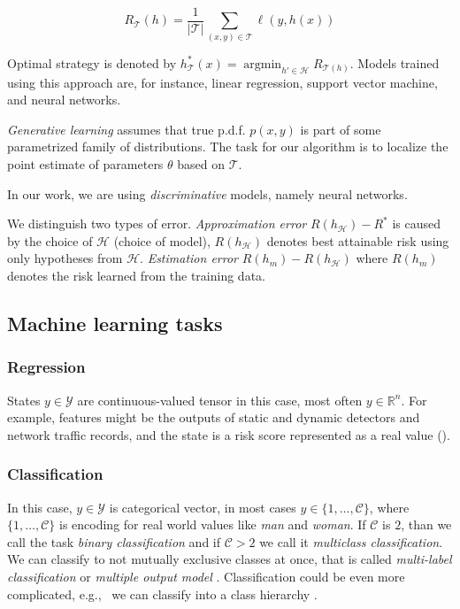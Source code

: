 \begin{equation} \label{eq:emploss}
    R_{\mathcal{T}}(h)= \frac{1}{|\mathcal{T}|} \sum_{(x,y) \in \mathcal
    T}\ell(y,h(x))
\end{equation}

Optimal strategy is denoted by $h_{\mathcal{T}}^*(x)=\operatorname*{argmin}_{{h}'\in \mathcal{H}}R_{\mathcal{T}(h)}$. Models trained using this approach are, for instance, linear regression, support vector machine, and neural networks.

\emph{Generative learning} assumes that true p.d.f. $p(x,y)$ is part of some parametrized family of distributions. The task for our algorithm is to localize the point estimate of parameters $\theta$ based on $\mathcal{T}$.

In our work, we are using \emph{discriminative} models, namely neural networks.


We distinguish two types of error. \emph{Approximation error} $R(h_{\mathcal{H}})-R^*$  is caused by the choice of $\mathcal{H}$ (choice of model), $R(h_{\mathcal{H}})$ denotes best attainable risk using only hypotheses from $\mathcal{H}$. \emph{Estimation error} $R(h_{m})-R(h_{\mathcal{H}})$ where $R(h_{m})$ denotes the risk learned from the training data.


\subsection{Machine learning tasks}
\subsubsection*{Regression}
States $y \in \mathcal{Y}$ are continuous-valued tensor in this case, most often $y \in \mathbb{R}^{n}$. For example, features might be the outputs of static and dynamic detectors and network traffic records, and the state is a risk score represented as a real value (\cite{Jaganathan2015}).

\subsubsection*{Classification}
In this case, $y \in \mathcal{Y}$ is categorical vector, in most cases $y \in \{1,\dots,\mathcal{C}\}$, where $\{1,\dots,\mathcal{C}\}$ is encoding for real world values like \emph{man} and \emph{woman}. If $\mathcal{C}$ is $2$, than we call the task \emph{binary classification} and if $\mathcal{C}>2$ we call it \emph{multiclass classification}. We can classify to not mutually exclusive classes at once, that is called \emph{multi-label classification} or \emph{multiple output model} \cite{murphy2013machine}. Classification could be even more complicated, e.g., \ we can classify into a class hierarchy \cite{zhang2020dive}.

